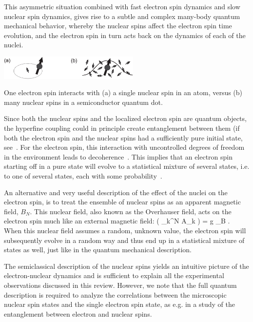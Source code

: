 \documentclass[12pt,aps,nofootinbib]{revtex4-1}
\begin{document}
This asymmetric situation combined with fast electron spin dynamics and slow nuclear spin dynamics, gives rise to a subtle and complex many-body quantum mechanical behavior, whereby the nuclear spins affect the electron spin time evolution, and the electron spin in turn acts back on the dynamics of each of the nuclei.

\bfig
\begin{center}
\includegraphics[width=7cm]{hanson_fig24.eps}
\end{center}
\caption{One electron spin interacts with (a) a single nuclear
spin in an atom, versus (b) many nuclear spins in a semiconductor
quantum dot.} \label{fig:hyperfine} \efig

Since both the nuclear spins and the localized electron spin are quantum objects, the hyperfine coupling could in principle create entanglement between them (if both the electron spin and the nuclear spins had a sufficiently pure initial state, see~\textcite{braunstein99}. For the electron spin, this interaction with
uncontrolled degrees of freedom in the environment leads to decoherence~\cite{merkulov02,khaetskii02,khaetskii03,coish04}. This implies that an electron spin starting off in a pure state will
evolve to a statistical mixture of several states, i.e. to one of
several states, each with some probability~\cite{nielsen00}.

An alternative and very useful description of the effect of the
nuclei on the electron spin, is to treat the ensemble of nuclear
spins as an apparent magnetic field, $B_N$. This nuclear
field, also known as the Overhauser field, acts on the electron
spin much like an external magnetic field: 
\be 
\left( \sum_k^N A_k \right) 
= g \mu_B   \;.
\label{eq:H_HF_class} 
\ee 
When this nuclear field assumes a random, unknown value, the electron spin will subsequently evolve in a random way and thus end up in a statistical mixture of states as well, just like in the quantum mechanical description.

The semiclassical description of the nuclear spins yields an intuitive
picture of the electron-nuclear dynamics and is sufficient to explain all the experimental observations discussed in this review. However, we note that the full quantum description is required to analyze the correlations between the microscopic nuclear spin states and the single electron spin state, as e.g. in a study of the entanglement between electron and nuclear spins.
\end{document}
